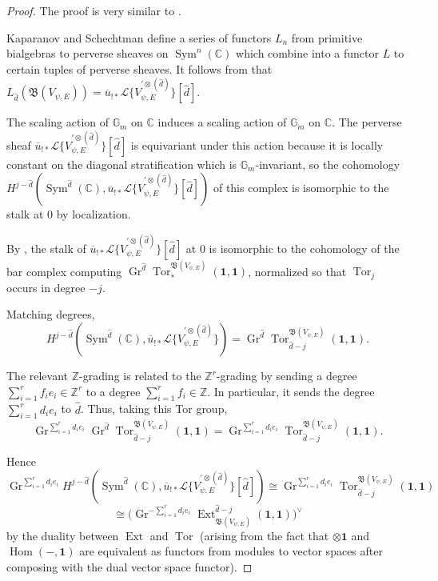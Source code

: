 \documentclass[11pt,letterpaper]{article}
\theoremstyle{definition}
\theoremstyle{remark}
\numberwithin{equation}{section}
\theoremstyle{dotless}
\newcommand{\Gr}{\operatorname{Gr}}
\newcommand{\hchi}{\psi} %
\begin{document}
\begin{proof} The proof is very similar to \cite[Corollary 3.3.4]{KapranovSchechtman}.

Kaparanov and Schechtman define \cite[Theorem 3.3.1]{KapranovSchechtman} a series of functors $L_n$ from primitive bialgebras to perverse sheaves on $\operatorname{Sym}^n (\mathbb C)$ which combine into a functor $L$ to certain tuples of perverse sheaves. It follows from \cite[Theorem 3.3.3(c)]{KapranovSchechtman} that $ L_{\hat{d}} ( \mathfrak B(V_{\hchi,E} )) =  \overline{u}_{!*} \mathcal L\{ V^{ '\otimes (\hat{d})}_{\hchi ,E} \} [\hat{d}] $.

The scaling action of $\mathbb G_m$ on $\mathbb C$ induces a scaling action of $\mathbb G_m$ on $\mathbb C$. The perverse sheaf $ \overline{u}_{!*} \mathcal L \{ V^{ '\otimes (\hat{d})}_{\hchi ,E} \}[\hat{d}] $ is equivariant under this action because it is locally constant on the diagonal stratification which is $\mathbb G_m$-invariant, so the cohomology $H^{j-\hat{d}}  ( \operatorname{Sym}^{\hat{d} } (\mathbb C),  \overline{u}_{!*} \mathcal L\{ V^{ '\otimes (\hat{d})}_{\hchi ,E} \} [\hat{d}] )$ of this complex is isomorphic to the stalk at $0$ by localization.

By \cite[Theorem 3.3.1(d)]{KapranovSchechtman}, the stalk of $\overline{u}_{!*} \mathcal L\{ V^{ '\otimes (\hat{d})}_{\hchi ,E} \}[\hat{d}] $ at $0$ is isomorphic to the cohomology of the bar complex computing $ \Gr^{ \hat{d}} \operatorname{Tor}_* ^{ \mathfrak B( V_{\hchi,E} )} (\mathbf 1, \mathbf 1)$, normalized so that $\operatorname{Tor}_j$ occurs in degree $-j$.

Matching degrees, \[ H^{j-\hat{d}}  ( \operatorname{Sym}^{\hat{d} } (\mathbb C),  \overline{u}_{!*} \mathcal L\{ V^{ '\otimes (\hat{d})}_{\hchi ,E} \} )= \Gr^{\hat{d}} \operatorname{Tor}_{\hat{d}-j} ^{ \mathfrak B( V_{\hchi,E} )} (\mathbf 1, \mathbf 1).\]

The relevant $\mathbb Z$-grading is related to the $\mathbb Z^r$-grading by sending a degree $\sum_{i=1}^r f_i e_i \in \mathbb Z^r$ to a degree $\sum_{i=1}^r f_i \in \mathbb Z$. In particular, it sends the degree $ \sum_{i=1}^r d_i e_i$ to $\hat{d}$. Thus, taking this Tor group,  \[  \Gr^{ \sum_{i=1}^r d_i e_i} \Gr^{ \hat{d} } \operatorname{Tor}_{\hat{d}-j} ^{ \mathfrak B( V_{\hchi,E} )} (\mathbf 1, \mathbf 1)=  \Gr^{ \sum_{i=1}^r d_i e_i}\operatorname{Tor}_{\hat{d}-j} ^{ \mathfrak B( V_{\hchi,E} )} (\mathbf 1, \mathbf 1).\]

Hence \[  \Gr^{ \sum_{i=1}^r d_i e_i} H^{j-\hat{d}}  ( \operatorname{Sym}^{\hat{d} } (\mathbb C),  \overline{u}_{!*} \mathcal L\{ V^{ '\otimes (\hat{d})}_{\hchi ,E} \} [\hat{d}]) \cong  \Gr^{ \sum_{i=1}^r d_i e_i} \operatorname{Tor}_{\hat{d}-j} ^{ \mathfrak B( V_{\hchi,E} )} (\mathbf 1, \mathbf 1) \] \[
\cong \Biggl(  \Gr^{ -\sum_{i=1}^r d_i e_i} \operatorname{Ext}^{\hat{d}-j } _{ \mathfrak B( V_{\hchi,E} )} (\mathbf 1, \mathbf 1)  \Biggr)^\vee \]
by the duality between $\operatorname{Ext}$ and $\operatorname{Tor}$ (arising from the fact that $\otimes \mathbf 1$ and $\operatorname{Hom}( -, \mathbf 1)$ are equivalent as functors from modules to vector spaces after composing with the dual vector space functor). \end{proof}
\end{document}

